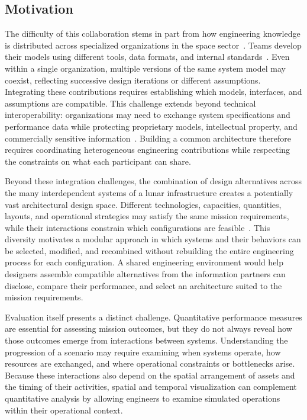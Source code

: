 \documentclass[10pt]{article}
\begin{document}
\subsection{Motivation}

The difficulty of this collaboration stems in part from how engineering knowledge is distributed across specialized organizations in the space sector~\cite{oecd_space_2022}. Teams develop their models using different tools, data formats, and internal standards~\cite{ciampa_agile_2020}. Even within a single organization, multiple versions of the same system model may coexist, reflecting successive design iterations or different assumptions. Integrating these contributions requires establishing which models, interfaces, and assumptions are compatible. This challenge extends beyond technical interoperability: organizations may need to exchange system specifications and performance data while protecting proprietary models, intellectual property, and commercially sensitive information~\cite{aisenberg_rights_2014}. Building a common architecture therefore requires coordinating heterogeneous engineering contributions while respecting the constraints on what each participant can share.

Beyond these integration challenges, the combination of design alternatives across the many interdependent systems of a lunar infrastructure creates a potentially vast architectural design space. Different technologies, capacities, quantities, layouts, and operational strategies may satisfy the same mission requirements, while their interactions constrain which configurations are feasible~\cite{boyer_delos_2025}. This diversity motivates a modular approach in which systems and their behaviors can be selected, modified, and recombined without rebuilding the entire engineering process for each configuration. A shared engineering environment would help designers assemble compatible alternatives from the information partners can disclose, compare their performance, and select an architecture suited to the mission requirements.

Evaluation itself presents a distinct challenge. Quantitative performance measures are essential for assessing mission outcomes, but they do not always reveal how those outcomes emerge from interactions between systems. Understanding the progression of a scenario may require examining when systems operate, how resources are exchanged, and where operational constraints or bottlenecks arise. Because these interactions also depend on the spatial arrangement of assets and the timing of their activities, spatial and temporal visualization can complement quantitative analysis by allowing engineers to examine simulated operations within their operational context.
\end{document}
